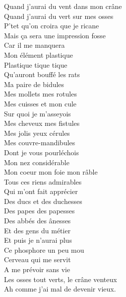 Quand j'aurai du vent dans mon crâne\\
Quand j'aurai du vert sur mes osses\\
P'tet qu'on croira que je ricane\\
Mais ça sera une impression fosse\\
Car il me manquera\\
Mon élément plastique\\
Plastique tique tique\\
Qu'auront bouffé les rats\\
Ma paire de bidules\\
Mes mollets mes rotules\\
Mes cuisses et mon cule\\
Sur quoi je m'asseyois\\
Mes cheveux mes fistules\\
Mes jolis yeux cérules\\
Mes couvre-mandibules\\
Dont je vous pourléchois\\
Mon nez considérable\\
Mon coeur mon foie mon râble\\
Tous ces riens admirables\\
Qui m'ont fait apprécier\\
Des ducs et des duchesses\\
Des papes des papesses\\
Des abbés des ânesses\\
Et des gens du métier\\
Et puis je n'aurai plus\\
Ce phosphore un peu mou\\
Cerveau qui me servit\\
A me prévoir sans vie\\
Les osses tout verts, le crâne venteux\\
Ah comme j'ai mal de devenir vieux.

